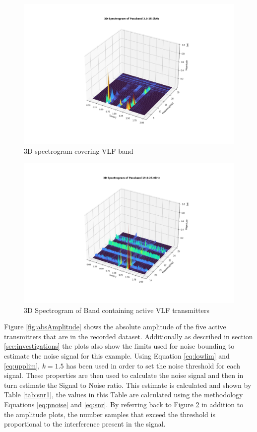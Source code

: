 \begin{figure}[h!]
        \centering
        \includegraphics[width = \textwidth]{figs/sig_character/vlfspectrogram.png}
        \caption{3D spectrogram covering VLF band}
        \label{fig:vlfspect}
\end{figure}
\begin{figure}[h!]
        \centering
        \includegraphics[width = \textwidth]{figs/sig_character/transmitters_spectrogram.png}
        \caption{3D Spectrogram of Band containing active VLF transmitters}
        \label{fig:transSpect}
\end{figure}

\pagebreak

Figure \ref{fig:absAmplitude} shows the absolute amplitude of the five active transmitters that are in the recorded dataset. Additionally as described in section \ref{sec:investigations} the plots also show the limits used for noise bounding to estimate the noise signal for this example. Using Equation \ref{eq:lowlim} and \ref{eq:upplim}, $k=1.5$ has been used in order to set the noise threshold for each signal. These properties are then used to calculate the noise signal and then in turn estimate the Signal to Noise ratio. This estimate is calculated and shown by Table \ref{tab:snr1}, the values in this Table are calculated using the methodology Equations \ref{eq:pnoise} and \ref{eq:snr}. By referring back to Figure \ref{fig:transSpect} in addition to the amplitude plots, the number samples that exceed the threshold is proportional to the interference present in the signal. 

